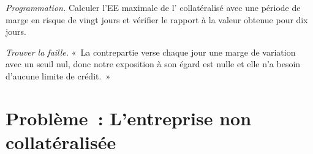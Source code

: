 \begin{exercise}[$\star\star\star$]\label{exo:rc:counterparty-exposure:7}
\emph{Programmation.} Calculer l'EE maximale de l' collatéralisé avec une période de marge en risque de vingt jours et
vérifier le rapport à la valeur obtenue pour dix jours.
\end{exercise}

\begin{exercise}[$\star\star\star$]\label{exo:rc:counterparty-exposure:8}
\emph{Trouver la faille.} «~La contrepartie verse chaque jour une marge de variation avec un seuil nul,
donc notre exposition à son égard est nulle et elle n'a besoin d'aucune limite de crédit.~»
\end{exercise}

\section{Problème~: L'entreprise non collatéralisée}

